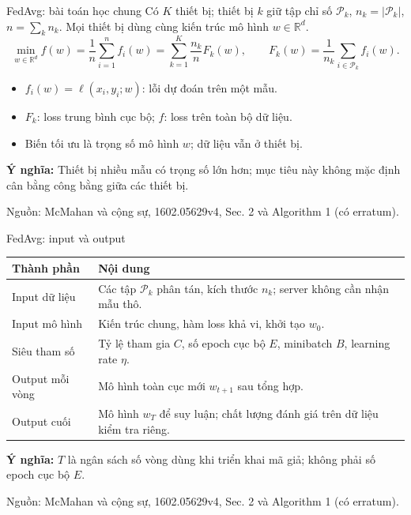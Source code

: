 \documentclass[10pt,aspectratio=43]{beamer}
\newcommand{\source}[1]{\par\vfill{\fontsize{5.8}{7}\selectfont\color{Muted}Nguồn: #1\par}}
\newcommand{\eqmeaning}[1]{\par\medskip\textcolor{HustRed}{\textbf{Ý nghĩa:}} #1\par}
\begin{document}
\begin{frame}[t]{FedAvg: bài toán học chung}\relax
\small
Có $K$ thiết bị; thiết bị $k$ giữ tập chỉ số $\mathcal P_k$, $n_k=|\mathcal P_k|$, $n=\sum_k n_k$. Mọi thiết bị dùng cùng kiến trúc mô hình $w\in\mathbb R^d$.
\[\min_{w\in\mathbb R^d}f(w)=\frac1n\sum_{i=1}^n f_i(w)
=\sum_{k=1}^K\frac{n_k}{n}F_k(w),\qquad
F_k(w)=\frac1{n_k}\sum_{i\in\mathcal P_k}f_i(w).\]
\begin{itemize}\item $f_i(w)=\ell(x_i,y_i;w)$: lỗi dự đoán trên một mẫu.
\item $F_k$: loss trung bình cục bộ; $f$: loss trên toàn bộ dữ liệu.
\item Biến tối ưu là trọng số mô hình $w$; dữ liệu vẫn ở thiết bị.
\end{itemize}
\eqmeaning{Thiết bị nhiều mẫu có trọng số lớn hơn; mục tiêu này không mặc định cân bằng công bằng giữa các thiết bị.}
\source{McMahan và cộng sự, 1602.05629v4, Sec. 2 và Algorithm 1 (có erratum).}
\end{frame}

\begin{frame}[t]{FedAvg: input và output}\relax
\small
\begin{tabularx}{\textwidth}{@{}p{2cm}Y@{}}\toprule
Thành phần & Nội dung\\\midrule
Input dữ liệu & Các tập $\mathcal P_k$ phân tán, kích thước $n_k$; server không cần nhận mẫu thô.\\
Input mô hình & Kiến trúc chung, hàm loss khả vi, khởi tạo $w_0$.\\
Siêu tham số & Tỷ lệ tham gia $C$, số epoch cục bộ $E$, minibatch $B$, learning rate $\eta$.\\
Output mỗi vòng & Mô hình toàn cục mới $w_{t+1}$ sau tổng hợp.\\
Output cuối & Mô hình $w_T$ để suy luận; chất lượng đánh giá trên dữ liệu kiểm tra riêng.\\\bottomrule\end{tabularx}
\eqmeaning{$T$ là ngân sách số vòng dùng khi triển khai mã giả; không phải số epoch cục bộ $E$.}
\source{McMahan và cộng sự, 1602.05629v4, Sec. 2 và Algorithm 1 (có erratum).}
\end{frame}
\end{document}
